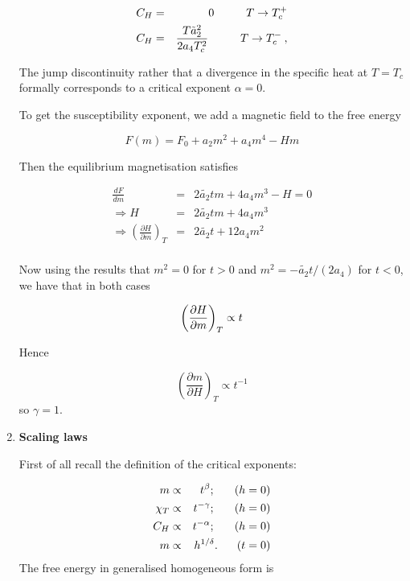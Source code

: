 \documentclass[a4paper,12pt,twoside]{article}
\begin{document}
\begin{enumerate}
\begin{eqnarray}
C_H &=& 0 \hspace*{1cm} T\to T_c^+\nonumber\\
C_H &=& \frac{T\tilde a_2^2}{2a_4T_c^2} \hspace*{1cm} T \to T_c^-\:,
\end{eqnarray}

The jump discontinuity rather that a divergence in the specific heat at
$T=T_c$ formally corresponds to a critical exponent $\alpha=0$.

To get the susceptibility exponent, we add a magnetic field to the free
energy


\[
F(m)=F_0+a_2m^2+a_4m^4-Hm
\]

Then the equilibrium magnetisation satisfies

\begin{eqnarray*}
\frac{dF}{dm}&=&2\tilde{a_2} tm+4a_4m^3-H=0\\
\Rightarrow H&=&2\tilde{a_2} tm+4a_4m^3\\
\Rightarrow \left(\frac{\partial H}{\partial m}\right )_T&=&2\tilde{a_2} t+12a_4m^2\\
\end{eqnarray*}

Now using the results that $m^2=0$ for $t>0$ and $m^2=-\tilde{a_2}t/(2a_4)$ for $t<0$, we have 
that in both cases 

\[
\left(\frac{\partial H}{\partial m}\right )_T\propto t\\
\]

Hence

\[
\left(\frac{\partial m}{\partial H}\right )_T\propto t^{-1}
\]
so $\gamma=1$.


\item {\bf Scaling laws}

First of all recall the definition of the critical exponents: 

\begin{eqnarray*}
m      & \propto & t^{\beta};\hspace*{6mm}(h=0)\\ 
\chi_T & \propto & t^{-\gamma};\hspace*{6mm}(h=0)\\ 
C_H & \propto & t^{-\alpha};\hspace*{6mm}(h=0)\\ 
m & \propto & h^{1/\delta}.\hspace*{6mm}(t=0)\\ 
\end{eqnarray*}
The free energy in generalised homogeneous form is 


\end{enumerate}
\end{document}

